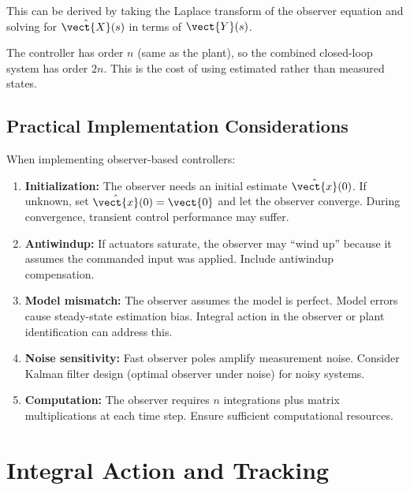This can be derived by taking the Laplace transform of the observer equation and solving for $\hat{\vect{X}}(s)$ in terms of $\vect{Y}(s)$.

The controller has order $n$ (same as the plant), so the combined closed-loop system has order $2n$. This is the cost of using estimated rather than measured states.

\subsection{Practical Implementation Considerations}

When implementing observer-based controllers:

\begin{enumerate}
    \item \textbf{Initialization:} The observer needs an initial estimate $\hat{\vect{x}}(0)$. If unknown, set $\hat{\vect{x}}(0) = \vect{0}$ and let the observer converge. During convergence, transient control performance may suffer.

    \item \textbf{Antiwindup:} If actuators saturate, the observer may ``wind up'' because it assumes the commanded input was applied. Include antiwindup compensation.

    \item \textbf{Model mismatch:} The observer assumes the model is perfect. Model errors cause steady-state estimation bias. Integral action in the observer or plant identification can address this.

    \item \textbf{Noise sensitivity:} Fast observer poles amplify measurement noise. Consider Kalman filter design (optimal observer under noise) for noisy systems.

    \item \textbf{Computation:} The observer requires $n$ integrations plus matrix multiplications at each time step. Ensure sufficient computational resources.
\end{enumerate}

\section{Integral Action and Tracking}
\label{sec:integral_action}

